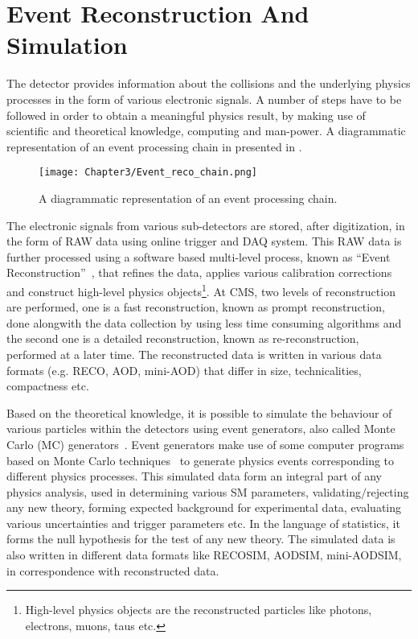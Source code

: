 \chapter{Event Reconstruction And Simulation}\label{ch:chapter3}
The detector provides information about the collisions and the underlying physics processes in the form of various electronic signals.
A number of steps have to be followed in order to obtain a meaningful physics result,
by making use of scientific and theoretical knowledge, computing and man-power. A diagrammatic representation of an event processing chain
in presented in \fig{\ref{fig:EvtChain}}.

\begin{figure}[h]
\begin{center}
\texttt{[image: Chapter3/Event\_reco\_chain.png]}
\caption{A diagrammatic representation of an event processing chain.}
\label{fig:EvtChain}
\end{center}
\end{figure}
\vspace{-0.2in}

The electronic signals from various sub-detectors are stored, after digitization, in the form of RAW data using online trigger and DAQ system.
This RAW data is further processed using a software based multi-level process, known as ``Event Reconstruction''~\cite{Lange:2011zza}, that refines the data,
applies various calibration corrections and construct high-level physics objects\footnote{High-level physics objects are the reconstructed particles like photons,
  electrons, muons, taus etc.}. At CMS, two levels of reconstruction are performed, one is a fast reconstruction, known as prompt reconstruction, done alongwith
the data collection by using less time consuming algorithms and the second one is a detailed reconstruction, known as re-reconstruction, performed at a later time.
The reconstructed data is written in various data formats (e.g. RECO, AOD, mini-AOD)
that differ in size, technicalities, compactness etc.

Based on the theoretical knowledge, it is possible to simulate the behaviour of various particles within the detectors using event generators, also
called Monte Carlo (MC) generators~\cite{Buckley:2011ms, Dobbs:2004qw}. Event generators make use of some computer programs based on Monte Carlo
techniques~\cite{MC_Tech} to generate physics events corresponding to different physics processes. This simulated data form an integral part of
any physics analysis, used in determining various SM parameters, validating$/$rejecting any new theory, forming expected background for experimental data,
evaluating various uncertainties and trigger parameters etc. In the language of statistics, it forms the null hypothesis for the test of any new theory. 
The simulated data is also written in different data formats like RECOSIM, AODSIM, mini-AODSIM, in correspondence with reconstructed data.


